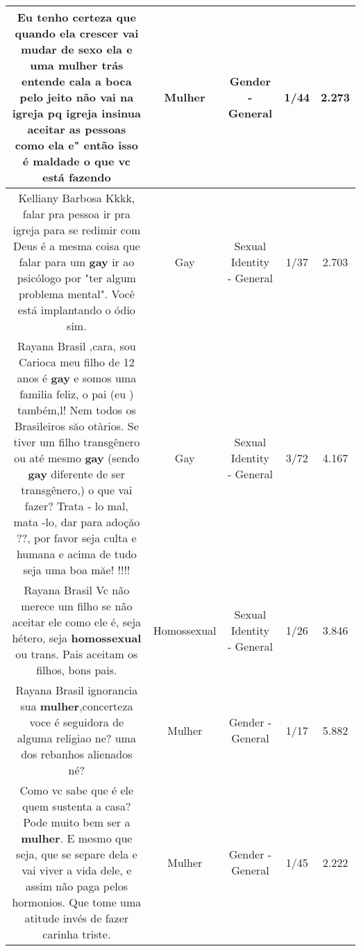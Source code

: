 \documentclass[11pt]{article}
\newlength\mylength
\begin{document}
\begin{center}
\begin{longtable}{|C{.65\mylength}|C{.30\mylength}|C{.12\mylength}|C{.12\mylength}|C{.12\mylength}|}
  \small Eu tenho certeza que quando ela crescer vai mudar de sexo ela e uma \textbf{mulher} trás entende cala a boca pelo jeito não vai na igreja pq igreja insinua aceitar as pessoas como ela e" então isso é maldade o que vc está fazendo\normalsize   & Mulher & Gender - General & 1/44 & 2.273 \\  \hline
  \small Kelliany Barbosa Kkkk, falar pra pessoa ir pra igreja para se redimir com Deus é a mesma coisa que falar para um \textbf{gay} ir ao psicólogo por "ter algum problema mental". Você está implantando o ódio sim.\normalsize   & Gay & Sexual Identity - General & 1/37 & 2.703 \\  \hline
  \small Rayana Brasil ,cara, sou Carioca meu filho de 12 anos é \textbf{gay} e somos uma familia feliz, o pai  (eu ) também,l! Nem todos os Brasileiros săo otàrios.  Se tiver um filho transgênero ou até mesmo \textbf{gay}  (sendo \textbf{gay}  diferente de ser transgênero,)  o que vai fazer?  Trata - lo mal, mata -lo, dar para adoçăo ??, por favor seja culta e humana e acima de tudo seja  uma boa măe! !!!!\normalsize   & Gay & Sexual Identity - General & 3/72 & 4.167 \\  \hline
  \small Rayana Brasil  Vc não merece um filho se não aceitar ele como ele é, seja hétero, seja \textbf{homossexual} ou trans. Pais aceitam os filhos, bons pais.\normalsize   & Homossexual & Sexual Identity - General & 1/26 & 3.846 \\  \hline
  \small Rayana Brasil ignorancia sua \textbf{mulher},concerteza voce é seguidora de alguma religiao ne? uma dos rebanhos alienados né?\normalsize   & Mulher & Gender - General & 1/17 & 5.882 \\  \hline
  \small Como vc sabe que é ele quem sustenta a casa? Pode muito bem ser a \textbf{mulher}. E mesmo que seja, que se separe dela e vai viver a vida dele, e assim não paga pelos hormonios. Que tome uma atitude invés de fazer carinha triste.\normalsize   & Mulher & Gender - General & 1/45 & 2.222 \\  \hline

\end{longtable}
\end{center}
\end{document}
